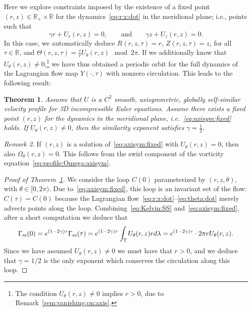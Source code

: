 \documentclass[11pt,reqno]{amsproc}
\numberwithin{equation}{section}
\newtheorem{theorem}{Theorem}[section]
\theoremstyle{remark}
\newtheorem{remark}[theorem]{Remark}
\begin{document}
Here we explore constraints imposed by the existence of a fixed point $(r,z) \in \mathbb{R}_+ \times \mathbb{R}$ for the dynamics~\eqref{eq:r:z:dot} in the meridional plane; i.e., points such that 
\begin{equation}
\label{eq:axisym:fixed}
\gamma r  + U_r (r ,z ) = 0,
\qquad \mbox{and} \qquad 
\gamma z  + U_z(r ,z ) = 0.
\end{equation}
In this case, we automatically deduce $R(r ,z ,\tau) = r $, $Z(r ,z ,\tau) = z $, for all $\tau \in \mathbb{R}$, and $\Theta (r ,z ,\tau) = \frac{\tau}{r } U_\theta(r ,z ) \mod 2\pi$. If we additionally know that $U_\theta(r ,z ) \neq 0$,\footnote{The condition $U_\theta(r ,z ) \neq 0$ implies $r>0$, due to Remark~\ref{rem:vanishing:on:axis}.} we have thus obtained a periodic orbit for the full dynamics of the Lagrangian flow map $Y(\cdot,\tau)$ with nonzero circulation. This leads to the following result:
\begin{theorem}
\label{thm:axissym:with:swirl}
Assume that $U$ is a $C^2$ smooth, axisymmetric, globally self-similar velocity profile for 3D incompressible Euler equations. Assume there exists a fixed point $(r,z)$ for the dynamics in the meridional plane, i.e.~\eqref{eq:axisym:fixed} holds.  If $U_\theta(r,z) \neq 0$, then the similarity exponent satisfies $\gamma = \tfrac 12$.
\end{theorem}

\begin{remark}
If $(r,z)$ is a solution of~\eqref{eq:axisym:fixed} with $U_\theta(r,z) =0$, then also $\Omega_\theta(r,z)=0$. This follows from the swirl component of the vorticity equation~\eqref{eq:profile:Omega:axisym}.
\end{remark}

\begin{proof}[Proof of Theorem~\ref{thm:axissym:with:swirl}]
We consider the loop $C(0)$ parameterized by $ (r,z, \theta )$, with $\theta \in [0,2\pi)$. Due to~\eqref{eq:axisym:fixed}, this loop is an invariant set of the flow: $C(\tau) = C(0)$ because the Lagrangian flow~\eqref{eq:r:z:dot}--\eqref{eq:theta:dot} merely advects points along the loop.  Combining~\eqref{eq:Kelvin:SS} and~\eqref{eq:axisym:fixed},  after a short computation we deduce that 
\[
\Gamma_{\rm ss}(0) = e^{(1-2\gamma)\tau}\Gamma_{\rm ss}(\tau) = e^{(1-2\gamma ) \tau} \int_{\mathbb{T}} U_\theta(r,z) r d\lambda = e^{(1-2\gamma ) \tau} \cdot 2\pi r U_\theta(r,z).
\]
Since we have assumed $ U_\theta(r ,z )\neq 0$ we must have that $r>0$, and we deduce that $\gamma = 1/2$ is the only exponent which conserves the circulation along this loop.
\end{proof}
\end{document}
